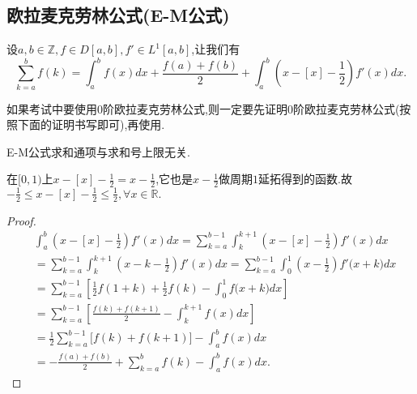 \documentclass[../../main.tex]{subfiles}
\begin{document}
\subsection{欧拉麦克劳林公式(E-M公式)}


\begin{proposition}\label{proposition:0阶欧拉麦克劳林公式(0阶E-M公式)}
设\(a,b\in\mathbb{Z}, f\in D[a,b], f'\in L^1[a,b]\),让我们有
\[
\sum_{k = a}^{b}f(k)=\int_{a}^{b}f(x)dx+\frac{f(a)+f(b)}{2}+\int_{a}^{b}\left(x - [x]-\frac{1}{2}\right)f'(x)dx.
\]
\end{proposition}
\begin{remark}
如果考试中要使用0阶欧拉麦克劳林公式,则一定要先证明0阶欧拉麦克劳林公式(按照下面的证明书写即可),再使用.

E-M公式求和通项与求和号上限无关.
\end{remark}
\begin{note}
在\([0,1)\)上\(x - [x]-\frac{1}{2}=x - \frac{1}{2}\),它也是\(x - \frac{1}{2}\)做周期\(1\)延拓得到的函数.故$-\frac{1}{2}\leqslant x-[x]-\frac{1}{2}\leqslant \frac{1}{2},\forall x\in \mathbb{R} .$
\end{note}
\begin{proof}
\begin{align*}
&\int_a^b{\left( x-[x]-\frac{1}{2} \right) f'(x)dx}=\sum_{k=a}^{b-1}{\int_k^{k+1}{\left( x-[x]-\frac{1}{2} \right) f'(x)dx}}
\\
&=\sum_{k=a}^{b-1}{\int_k^{k+1}{\left( x-k-\frac{1}{2} \right) f'(x)dx}}=\sum_{k=a}^{b-1}{\int_0^1{\left( x-\frac{1}{2} \right) f'(x}}+k)dx
\\
&=\sum_{k=a}^{b-1}{\left[ \frac{1}{2}f(1+k)+\frac{1}{2}f(k)-\int_0^1{f(x}+k)dx \right]}
\\
&=\sum_{k=a}^{b-1}{\left[ \frac{f(k)+f(k+1)}{2}-\int_k^{k+1}{f(x)dx} \right]}
\\
&=\frac{1}{2}\sum_{k=a}^{b-1}{[f(k)}+f(k+1)]-\int_a^b{f(x)dx}
\\
&=-\frac{f(a)+f(b)}{2}+\sum_{k=a}^b{f(k)}-\int_a^b{f(x)dx}.
\end{align*}
\end{proof}
\end{document}
